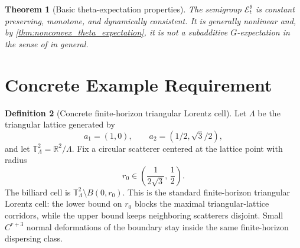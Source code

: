 \documentclass[11pt]{amsart}
\newtheorem{theorem}{Theorem}[section]
\theoremstyle{definition}
\newtheorem{definition}[theorem]{Definition}
\theoremstyle{remark}
\newcommand{\R}{\mathbb R}
\newcommand{\T}{\mathbb T}
\newcommand{\Etheta}{\mathcal E^\theta}
\begin{document}
\begin{theorem}[Basic theta-expectation properties]
\label{thm:theta_expectation_properties}
The semigroup $\Etheta_t$ is constant preserving, monotone, and dynamically
consistent.  It is generally nonlinear and, by
\cref{thm:nonconvex_theta_expectation}, it is not a subadditive
\(G\)-expectation in the sense of \cite{Peng2019} in general.
\end{theorem}

\section{Concrete Example Requirement}

\begin{definition}[Concrete finite-horizon triangular Lorentz cell]
\label{def:triangular_lorentz_cell}
Let $\Lambda$ be the triangular lattice generated by
\[
  a_1=(1,0),\qquad a_2=(1/2,\sqrt3/2),
\]
and let $\T_\Lambda^2=\R^2/\Lambda$.  Fix a circular scatterer centered at the
lattice point with radius
\[
  r_0\in\left(\frac{1}{2\sqrt3},\,\frac12\right).
\]
The billiard cell is $\T_\Lambda^2\setminus B(0,r_0)$.  This is the standard
finite-horizon triangular Lorentz cell: the lower bound on $r_0$ blocks the
maximal triangular-lattice corridors, while the upper bound keeps neighboring
scatterers disjoint.  Small $C^{r+3}$ normal deformations of the boundary stay
inside the same finite-horizon dispersing class.
\end{definition}
\end{document}
